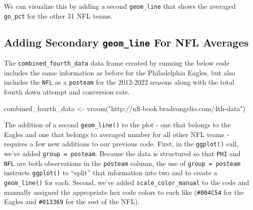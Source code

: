 \documentclass[
  letterpaper,
]{krantz}
\newenvironment{Shaded}{\begin{snugshade}}{\end{snugshade}}
\newcommand{\FunctionTok}[1]{\textcolor[rgb]{0.28,0.35,0.67}{#1}}
\newcommand{\NormalTok}[1]{\textcolor[rgb]{0.00,0.23,0.31}{#1}}
\newcommand{\OtherTok}[1]{\textcolor[rgb]{0.00,0.23,0.31}{#1}}
\newcommand{\StringTok}[1]{\textcolor[rgb]{0.13,0.47,0.30}{#1}}
\begin{document}
We can visualize this by adding a second \texttt{geom\_line} that shows
the averaged \texttt{go\_pct} for the other 31 NFL teams.

\hypertarget{adding-secondary-geom_line-for-nfl-averages}{%
\subsection{\texorpdfstring{Adding Secondary \texttt{geom\_line} For NFL
Averages}{Adding Secondary geom\_line For NFL Averages}}\label{adding-secondary-geom_line-for-nfl-averages}}

The \texttt{combined\_fourth\_data} data frame created by running the
below code includes the same information as before for the Philadelphia
Eagles, but also includes the \texttt{NFL} as a \texttt{posteam} for the
2012-2022 seasons along with the total fourth down attempt and
conversion rate.

\begin{Shaded}
\begin{Highlighting}[]
\NormalTok{combined\_fourth\_data }\OtherTok{\textless{}{-}} \FunctionTok{vroom}\NormalTok{(}\StringTok{"http://nfl{-}book.bradcongelio.com/4th{-}data"}\NormalTok{)}
\end{Highlighting}
\end{Shaded}

The addition of a second \texttt{geom\_line()} to the plot - one that
belongs to the Eagles and one that belongs to averaged number for all
other NFL teams - requires a few new additions to our previous code.
First, in the \texttt{ggplot()} call, we've added
\texttt{group\ =\ posteam}. Because the data is structured so that
\texttt{PHI} and \texttt{NFL} are both observations in the
\texttt{posteam} column, the use of \texttt{group\ =\ posteam} instructs
\texttt{ggplot()} to ``split'' that information into two and to create a
\texttt{geom\_line()} for each. Second, we've added
\texttt{scale\_color\_manual} to the code and manually assigned the
appropriate hex code colors to each like (\texttt{\#004C54} for the
Eagles and \texttt{\#013369} for the rest of the NFL).
\end{document}
